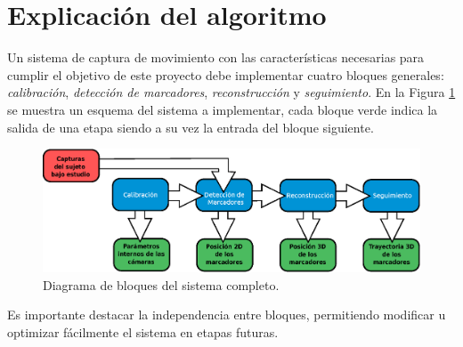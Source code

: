 \section{Explicación del algoritmo}\label{implementacion}
Un sistema de captura de movimiento con las características necesarias para cumplir el objetivo de este proyecto debe implementar cuatro bloques generales: \emph{calibración}, \emph{detección de marcadores}, \emph{reconstrucción} y \emph{seguimiento}. En la Figura \ref{bloquesSist} se muestra un esquema del sistema a implementar, cada bloque verde indica la salida de una etapa siendo  a su vez la entrada del bloque siguiente.
\vspace{-0.6cm}
\begin{figure}[ht!]
\centering
\hspace{-0.5cm}
\includegraphics[scale=0.4]{imagenes/Sistema_completo/Diagrama_de_bloques.eps}
\caption{Diagrama de bloques del sistema completo.}
\label{bloquesSist}
\end{figure}
\vspace{-0.7cm}

Es importante destacar la independencia entre bloques, permitiendo modificar u optimizar fácilmente el sistema en etapas futuras.

